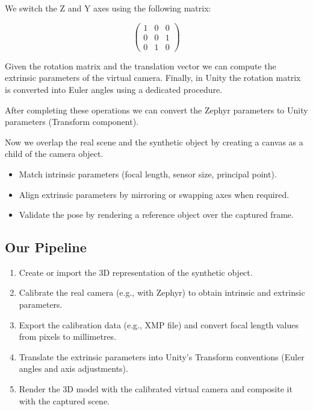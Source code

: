 \documentclass[11pt,a4paper]{article}
\theoremstyle{definition}
\theoremstyle{plain}
\theoremstyle{remark}
\begin{document}
We switch the Z and Y axes using the following matrix:

\begin{equation}
    \begin{pmatrix}
        1 & 0 & 0 \\
        0 & 0 & 1 \\
        0 & 1 & 0
    \end{pmatrix}
\end{equation}

Given the rotation matrix and the translation vector we can compute the extrinsic parameters of the virtual camera.
Finally, in Unity the rotation matrix is converted into Euler angles using a dedicated procedure.

After completing these operations we can convert the Zephyr parameters to Unity parameters (Transform component).

Now we overlap the real scene and the synthetic object by creating a canvas as a child of the camera object.

\begin{tcolorbox}[colback=yellow!8!white,colframe=orange!60!black,title=\textbf{Camera Alignment Checklist}]
\begin{itemize}
    \item Match intrinsic parameters (focal length, sensor size, principal point).
    \item Align extrinsic parameters by mirroring or swapping axes when required.
    \item Validate the pose by rendering a reference object over the captured frame.
\end{itemize}
\end{tcolorbox}

\subsection{Our Pipeline}

\begin{tcolorbox}[colback=green!6!white,colframe=green!50!black,title=\textbf{AR Integration Pipeline}]
\begin{enumerate}
    \item Create or import the 3D representation of the synthetic object.
    \item Calibrate the real camera (e.g., with Zephyr) to obtain intrinsic and extrinsic parameters.
    \item Export the calibration data (e.g., XMP file) and convert focal length values from pixels to millimetres.
    \item Translate the extrinsic parameters into Unity's Transform conventions (Euler angles and axis adjustments).
    \item Render the 3D model with the calibrated virtual camera and composite it with the captured scene.
\end{enumerate}
\end{tcolorbox}
\end{document}
